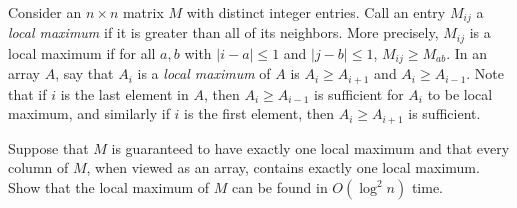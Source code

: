\begin{qunlist}
\pagebreak
{}

Consider an $n\times n$ matrix $M$ with distinct integer entries. Call an entry $M_{ij}$ a \emph{local maximum} if it is greater than all of its neighbors. More precisely, $M_{ij}$ is a local maximum if for all $a,b$ with $|i-a|\le 1$ and $|j-b|\le 1$, $M_{ij} \ge M_{ab}$. In an array $A$, say that $A_i$ is a \emph{local maximum} of $A$ is $A_i \ge A_{i+1}$ and $A_i \ge A_{i-1}$. Note that if $i$ is the last element in $A$, then $A_i \geq A_{i-1}$ is sufficient for $A_i$ to be local maximum, and similarly if $i$ is the first element, then $A_i \geq A_{i+1}$ is sufficient.

Suppose that $M$ is guaranteed to have exactly one local maximum and that every column of $M$, when viewed as an array, contains exactly one local maximum. Show that the local maximum of $M$ can be found in $O(\log^2 n)$ time. 


\end{qunlist}
